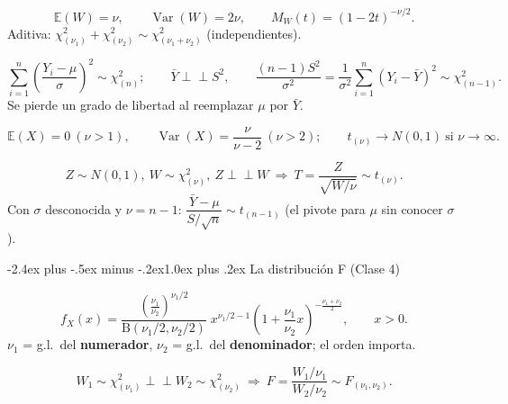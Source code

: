 \documentclass[10pt,a4paper]{article}
\makeatletter
\newcommand{\E}{\mathbb{E}}
\newcommand{\Var}{\operatorname{Var}}
\newcommand{\ind}{\perp\!\!\!\perp}
\renewcommand\section{\@startsection{section}{1}{0pt}%
  {-2.4ex plus -.5ex minus -.2ex}{1.0ex plus .2ex}%
  {\normalfont\large\bfseries\color{seccolor}}}
\makeatother
\begin{document}
\begin{defbox}[frametitle={Chi-cuadrado: $\chi^2_{(\nu)}=G(\nu/2,2)$}]
\[
\E(W)=\nu,\qquad \Var(W)=2\nu,\qquad M_W(t)=(1-2t)^{-\nu/2}.
\]
Aditiva: $\chi^2_{(\nu_1)}+\chi^2_{(\nu_2)}\sim\chi^2_{(\nu_1+\nu_2)}$
(independientes).
\end{defbox}

\begin{thmbox}[frametitle={Lema 1 y Teorema 2}]
\[
\sum_{i=1}^n\left(\frac{Y_i-\mu}{\sigma}\right)^2\sim\chi^2_{(n)};\qquad
\bar Y\ind S^2,\qquad
\frac{(n-1)S^2}{\sigma^2}=\frac{1}{\sigma^2}\sum_{i=1}^n(Y_i-\bar Y)^2\sim\chi^2_{(n-1)} .
\]
Se pierde un grado de libertad al reemplazar $\mu$ por $\bar Y$.
\end{thmbox}

\begin{defbox}[frametitle={t de Student}]
\[
\E(X)=0\ (\nu>1),\qquad \Var(X)=\frac{\nu}{\nu-2}\ (\nu>2);\qquad
t_{(\nu)}\to N(0,1)\ \text{si }\nu\to\infty .
\]
\end{defbox}

\begin{thmbox}[frametitle={Teorema 3: de dónde sale la $t$}]
\[
Z\sim N(0,1),\ W\sim\chi^2_{(\nu)},\ Z\ind W
\ \Longrightarrow\ T=\frac{Z}{\sqrt{W/\nu}}\sim t_{(\nu)} .
\]
Con $\sigma$ desconocida y $\nu=n-1$:\quad
$\dfrac{\bar Y-\mu}{S/\sqrt n}\sim t_{(n-1)}$ (el pivote para $\mu$ sin conocer
$\sigma$).
\end{thmbox}

\section{La distribución F \textmd{(Clase 4)}}

\begin{defbox}[frametitle={Definición (Fisher–Snedecor)}]
\[
f_X(x)=\frac{\left(\frac{\nu_1}{\nu_2}\right)^{\nu_1/2}}{\mathrm{B}(\nu_1/2,\nu_2/2)}\;
x^{\nu_1/2-1}\left(1+\frac{\nu_1}{\nu_2}x\right)^{-\frac{\nu_1+\nu_2}{2}},\qquad x>0 .
\]
$\nu_1$ = g.l.\ del \textbf{numerador}, $\nu_2$ = g.l.\ del \textbf{denominador};
el orden importa.
\end{defbox}

\begin{thmbox}[frametitle={Teorema 4}]
\[
W_1\sim\chi^2_{(\nu_1)}\ind W_2\sim\chi^2_{(\nu_2)}
\ \Longrightarrow\ F=\frac{W_1/\nu_1}{W_2/\nu_2}\sim F_{(\nu_1,\nu_2)} .
\]
\end{thmbox}
\end{document}
